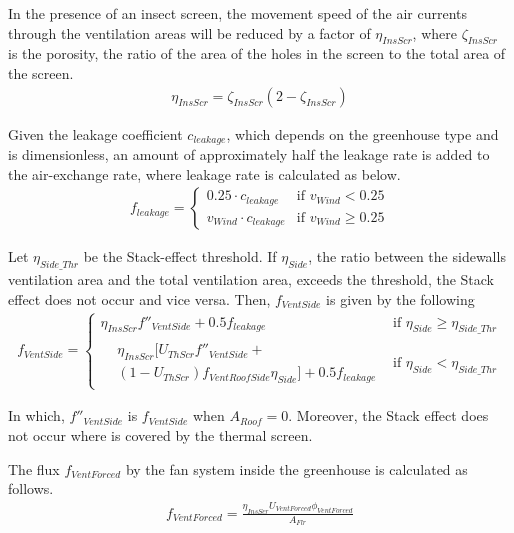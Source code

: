 \documentclass[a4paper]{article}
\begin{document}
In the presence of an insect screen, the movement speed of the air currents through the ventilation areas will be reduced by a factor of \(\eta_{InsScr}\), where \(\zeta_{InsScr}\) is the porosity, the ratio of the area of the holes in the screen to the total area of the screen.
\begin{align}
  \eta_{InsScr} = \zeta_{InsScr} (2 -  \zeta_{InsScr})
\end{align}

Given the leakage coefficient \(c_{leakage}\), which depends on the greenhouse type and is dimensionless, an amount of approximately half the leakage rate is added to the air-exchange rate, where leakage rate is calculated as below.
\begin{align}
  f_{leakage} = \begin{cases}
    0.25 \cdot c_{leakage}     & \text{if~} v_{Wind} < 0.25    \\
    v_{Wind} \cdot c_{leakage} & \text{if~} v_{Wind} \geq 0.25
  \end{cases}
\end{align}

Let \(\eta_{Side\_Thr}\) be the Stack-effect threshold. If \(\eta_{Side}\), the ratio between the sidewalls ventilation
area and the total ventilation area, exceeds the threshold, the Stack effect does not occur and vice versa. Then, \(f_{VentSide}\) is given by the following
\begin{gather}
  f_{VentSide} =
  \begin{cases}
    \eta_{InsScr} f''_{VentSide} + 0.5f_{leakage} & \text{if~} \eta_{Side} \geq \eta_{Side\_Thr} \\
    \begin{split}
      & \eta_{InsScr} [U_{ThScr}f''_{VentSide} + \\
      & (1-U_{ThScr})f_{VentRoofSide} \eta_{Side}] + 0.5 f_{leakage}
    \end{split}                    & \text{if~} \eta_{Side} < \eta_{Side\_Thr}
  \end{cases}
\end{gather}

In which,  \(f''_{VentSide}\) is  \(f_{VentSide}\) when \(A_{Roof} = 0\).
Moreover, the Stack effect does not occur where is covered by the thermal screen.

The flux \(f_{VentForced}\) by the fan system inside the greenhouse is calculated as follows.
\begin{align}
  f_{VentForced} = \frac{\eta_{InsScr} U_{VentForced} \phi_{VentForced} } {A_{Flr}}
\end{align}
\end{document}
